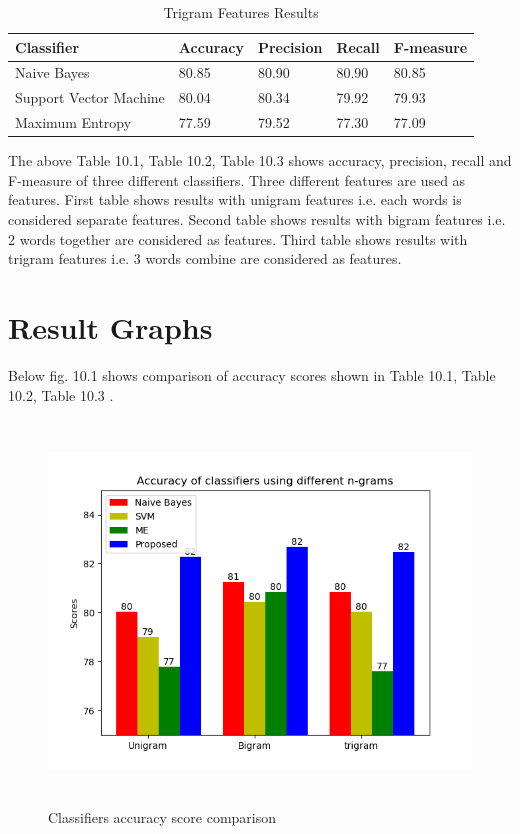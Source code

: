 \documentclass[oneside,a4paper,12pt]{pictreport}
\begin{document}
\begin{table}[h!]
\centering
\caption{Trigram Features Results}
\label{my-label}
\begin{tabular}{|l|l|l|l|l|}
\hline
\textbf{Classifier} & \textbf{Accuracy} & \textbf{Precision} & \textbf{Recall} & \textbf{F-measure}\\ \hline
Naive Bayes          & 80.85  & 80.90 & 80.90 & 80.85                   \\ \hline
Support Vector Machine          & 80.04  & 80.34 & 79.92 & 79.93                   \\ \hline
Maximum Entropy          & 77.59  & 79.52 & 77.30 & 77.09 \\ \hline
\end{tabular}
\end{table}

\vspace{5mm}
\par The above Table 10.1, Table 10.2, Table 10.3 shows accuracy, precision, recall and F-measure
of three different classifiers. Three different features are used as features.
First table shows results with unigram features i.e. each words is considered separate features.
Second table shows results with bigram features i.e. 2 words together are considered as features.
Third table shows results with trigram features i.e. 3 words combine are considered as features.
\newpage
\section{Result Graphs}
\vspace{5mm}

\par Below fig. 10.1 shows comparison of accuracy scores shown in Table 10.1, Table 10.2, Table 10.3 .

\begin{figure}[!h]
\includegraphics[width=5.0in,height=4.0in]{Comparison.png}
\caption{Classifiers accuracy score comparison}
\end{figure}
\end{document}
